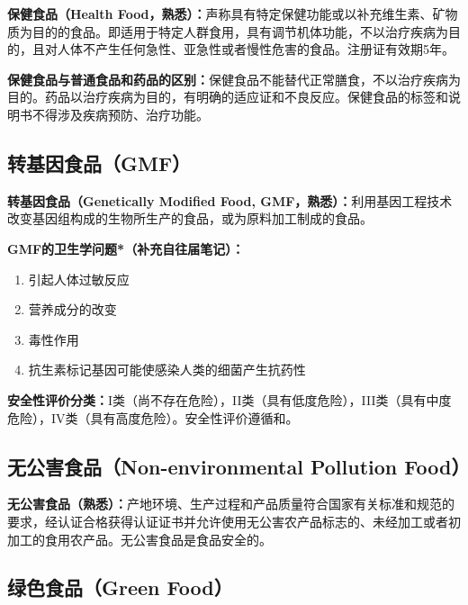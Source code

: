\begin{tipbox}
\textbf{保健食品（Health Food，熟悉）：}声称具有特定保健功能或以补充维生素、矿物质为目的的食品。即适用于特定人群食用，具有调节机体功能，不以治疗疾病为目的，且对人体不产生任何急性、亚急性或者慢性危害的食品。注册证有效期5年。 %

\textbf{保健食品与普通食品和药品的区别：}保健食品不能替代正常膳食，不以治疗疾病为目的。药品以治疗疾病为目的，有明确的适应证和不良反应。保健食品的标签和说明书不得涉及疾病预防、治疗功能。
\end{tipbox}

\subsection{转基因食品（GMF）}

\begin{tipbox}
\textbf{转基因食品（Genetically Modified Food, GMF，熟悉）：}利用基因工程技术改变基因组构成的生物所生产的食品，或为原料加工制成的食品。%

\textbf{GMF的卫生学问题*（补充自往届笔记）：}
\begin{enumerate}[leftmargin=*]
    \item 引起人体过敏反应
    \item 营养成分的改变
    \item 毒性作用
    \item 抗生素标记基因可能使感染人类的细菌产生抗药性
\end{enumerate}

\textbf{安全性评价分类：}I类（尚不存在危险），II类（具有低度危险），III类（具有中度危险），IV类（具有高度危险）。安全性评价遵循和。
\end{tipbox}

\subsection{无公害食品（Non-environmental Pollution Food）}

\begin{tipbox}
\textbf{无公害食品（熟悉）：}产地环境、生产过程和产品质量符合国家有关标准和规范的要求，经认证合格获得认证证书并允许使用无公害农产品标志的、未经加工或者初加工的食用农产品。无公害食品是食品安全的。%
\end{tipbox}

\subsection{绿色食品（Green Food）}

